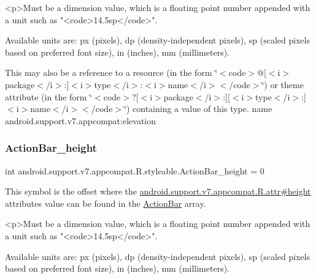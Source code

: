 \begin{DoxyVerb}      <p>Must be a dimension value, which is a floating point number appended with a unit such as "<code>14.5sp</code>".
\end{DoxyVerb}
 Available units are\+: px (pixels), dp (density-\/independent pixels), sp (scaled pixels based on preferred font size), in (inches), mm (millimeters). 

This may also be a reference to a resource (in the form \char`\"{}$<$code$>$@\mbox{[}$<$i$>$package$<$/i$>$\+:\mbox{]}$<$i$>$type$<$/i$>$\+:$<$i$>$name$<$/i$>$$<$/code$>$\char`\"{}) or theme attribute (in the form \char`\"{}$<$code$>$?\mbox{[}$<$i$>$package$<$/i$>$\+:\mbox{]}\mbox{[}$<$i$>$type$<$/i$>$\+:\mbox{]}$<$i$>$name$<$/i$>$$<$/code$>$\char`\"{}) containing a value of this type.  name android.\+support.\+v7.\+appcompat\+:elevation \mbox{\label{classandroid_1_1support_1_1v7_1_1appcompat_1_1R_1_1styleable_ae5219a04a81a3e04ff4b973e9188ca3a}} 
\subsubsection{\texorpdfstring{Action\+Bar\+\_\+height}{ActionBar\_height}}
{\footnotesize\ttfamily int android.\+support.\+v7.\+appcompat.\+R.\+styleable.\+Action\+Bar\+\_\+height = 0\hspace{0.3cm}{\ttfamily [static]}}

This symbol is the offset where the \hyperlink{classandroid_1_1support_1_1v7_1_1appcompat_1_1R_1_1attr_ac0327a7cdb8d8e0b1c7726e150ba0576}{android.\+support.\+v7.\+appcompat.\+R.\+attr\#height} attribute\textquotesingle{}s value can be found in the \hyperlink{classandroid_1_1support_1_1v7_1_1appcompat_1_1R_1_1styleable_a5941dc15714398e9ec9afaa0155cc1cf}{Action\+Bar} array.

\begin{DoxyVerb}      <p>Must be a dimension value, which is a floating point number appended with a unit such as "<code>14.5sp</code>".
\end{DoxyVerb}
 Available units are\+: px (pixels), dp (density-\/independent pixels), sp (scaled pixels based on preferred font size), in (inches), mm (millimeters). 

